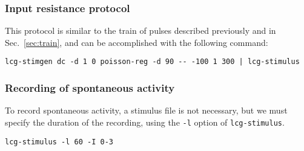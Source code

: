 \subsubsection{Input resistance protocol}
This protocol is similar to the train of pulses described previously
and in Sec.~\ref{sec:train}, and can be accomplished with the
following command:
\begin{lstlisting}
lcg-stimgen dc -d 1 0 poisson-reg -d 90 -- -100 1 300 | lcg-stimulus
\end{lstlisting}

\subsubsection{Recording of spontaneous activity}
To record spontaneous activity, a stimulus file is not necessary, but
we must specify the duration of the recording, using the \verb+-l+
option of \verb+lcg-stimulus+.
\begin{lstlisting}
lcg-stimulus -l 60 -I 0-3
\end{lstlisting}